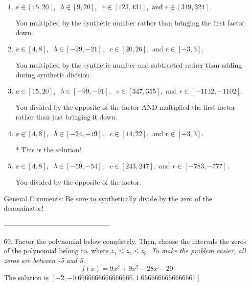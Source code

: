 \documentclass{extbook}[14pt]
\begin{document}
\begin{enumerate}[label=\Alph*.] 
\item $ a \in [15, 20], \text{   } b \in [9, 20], \text{   } c \in [123, 131], \text{   and   } r \in [319, 324]. $ 

  You multiplied by the synthetic number rather than bringing the first factor down. 
\item $ a \in [4, 8], \text{   } b \in [-29, -21], \text{   } c \in [20, 26], \text{   and   } r \in [-3, 3]. $ 

  You multiplied by the synthetic number and subtracted rather than adding during synthetic division. 
\item $ a \in [15, 20], \text{   } b \in [-99, -91], \text{   } c \in [347, 355], \text{   and   } r \in [-1112, -1102]. $ 

  You divided by the opposite of the factor AND multiplied the first factor rather than just bringing it down. 
\item $ a \in [4, 8], \text{   } b \in [-24, -19], \text{   } c \in [14, 22], \text{   and   } r \in [-3, 3]. $ 

 * This is the solution! 
\item $ a \in [4, 8], \text{   } b \in [-59, -54], \text{   } c \in [243, 247], \text{   and   } r \in [-783, -777]. $ 

  You divided by the opposite of the factor. 
\end{enumerate} 
 
General Comments: Be sure to synthetically divide by the zero of the denominator!

-----------------------------------------------

69. Factor the polynomial below completely. Then, choose the intervals the zeros of the polynomial belong to, where $z_1 \leq z_2 \leq z_3$. \textit{To make the problem easier, all zeros are between -5 and 5.}
\[ f(x) = 9x^{3} +9 x^{2} -28 x -20 \] 
The solution is $ [-2, -0.6666666666666666, 1.6666666666666667] $ 
\end{document}
